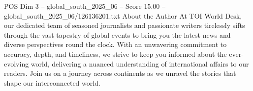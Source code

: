 \begin{textsample}{POS Dim 3 – global\_south\_2025\_06 – Score 15.00 – global\_south\_2025\_06/126136201.txt}
About the Author At TOI World Desk, our dedicated team of seasoned journalists and passionate writers tirelessly sifts through the vast tapestry of global events to bring you the latest news and diverse perspectives round the clock.
With an unwavering commitment to accuracy, depth, and timeliness, we strive to keep you informed about the ever-evolving world, delivering a nuanced understanding of international affairs to our readers.
Join us on a journey across continents as we unravel the stories that shape our interconnected world.

\end{textsample}
